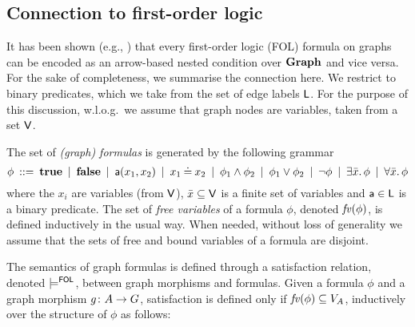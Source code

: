 \subsection{Connection to first-order logic}
\label{sec:FOL}

It has been shown (e.g., \cite{Rensink-FOL,Habel-FOL}) that every first-order logic (FOL) formula on graphs can be encoded as an arrow-based nested condition over $\mathbf{Graph}$ and vice versa. For the sake of completeness, we summarise the connection here. We restrict to binary predicates, which we take from the set of edge labels $\mathsf{L}$. For the purpose of this discussion, w.l.o.g.\ we assume that graph nodes are variables, taken from a set $\mathsf{V}$.



\begin{definition}
  \label{def:graph_formulas}
The set of \emph{(graph) formulas} is generated by the following grammar
%
\[ \phi \:::=\: \textbf{true}
        \:\mid\: \textbf{false}
		\:\mid\: \mathsf{a}(x_1,x_2)
        \:\mid\: x_1 \mathbin{\doteq} x_2
		\:\mid\: \phi_1\wedge \phi_2
		\:\mid\: \phi_1\vee \phi_2
		\:\mid\: \neg\phi
		\:\mid\: \exists \bar x.\, \phi 
		\:\mid\: \forall \bar x.\, \phi 
		\]
where the $x_i$ are variables (from $\mathsf{V}$), 
$\bar x\subseteq \mathsf{V}$ is a finite set of variables and $\mathsf{a} \in \mathsf{L}$ is a binary predicate. The set of \emph{free variables} of a formula $\phi$, denoted $\mathit{fv}(\phi)$, is defined inductively in the usual way. When needed, without loss of generality we assume that the sets of free and bound variables of a formula are disjoint.  

The semantics of graph formulas is defined through a satisfaction relation, denoted $\models^{\mathsf{FOL}}$, between graph morphisms and formulas. Given a formula $\phi$ and a graph morphism $g \colon A \rightarrow G$, satisfaction is defined only if $\mathit{fv}(\phi) \subseteq V_A$, inductively over the structure of $\phi$ as follows: 


\end{definition}
